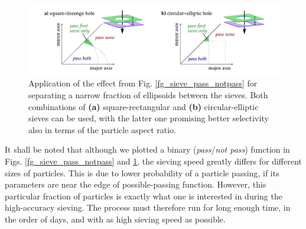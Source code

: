 \begin{figure}[ht] \caption{Application of the effect from Fig. \ref{fg_sieve_pass_notpass} for separating a narrow fraction of ellipsoids between the sieves. Both combinations of \textbf{(a)} square-rectangular and \textbf{(b)} circular-elliptic sieves can be used, with the latter one promising better selectivity also in terms of the particle aspect ratio.} \label{fg_double_sieving} \centering 
\includegraphics[width=\textwidth]{img/technology/sieve_double_sieving_fractions.pdf}
\end{figure}
It shall be noted that although we plotted a binary (\textit{pass}/\textit{not pass}) function in Figs. \ref{fg_sieve_pass_notpass} and \ref{fg_double_sieving}, the sieving speed greatly differs for different sizes of particles. This is due to lower probability of a particle passing, if its parameters are near the edge of possible-passing function. 
However, this particular fraction of particles is exactly what one is interested in during the high-accuracy sieving. The process must therefore run for long enough time, in the order of days, and with as high sieving speed as possible.
